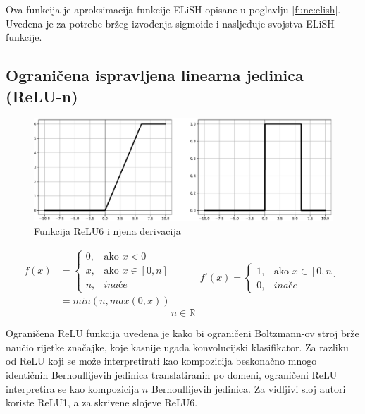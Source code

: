 \documentclass[times, utf8, numeric, diplomski]{fer}
\def\realnum{\mathbb{R}}
\def\otherwise{\textit{inače}}
\begin{document}
Ova funkcija je aproksimacija funkcije ELiSH opisane u poglavlju \ref{func:elish}. Uvedena je za potrebe bržeg izvođenja sigmoide i nasljeđuje svojstva ELiSH funkcije. \citep{elish}

\subsection{Ograničena ispravljena linearna jedinica (ReLU-n)}
\label{func:relun}

\begin{figure}[H]
\includegraphics[width=\textwidth]{func_ReLU6.pdf}
\centering
\caption{Funkcija ReLU6 i njena derivacija}
\label{fig:relu6}
\end{figure}

\begin{equation}
\label{eq:relun}
\begin{split}
f(x) &= \begin{cases}
0,		& \text{ako } x < 0 \\
x,		& \text{ako } x \in [0, n] \\
n,		& \otherwise
\end{cases} \\
&= min(n, max(0, x))
\end{split}
\qquad
\begin{split}
f'(x) = 
\begin{cases}
1,		& \text{ako } x \in [0, n] \\
0,		& \otherwise
\end{cases}
\end{split}
\end{equation}
\begin{equation*}
n \in \realnum
\end{equation*}

Ograničena ReLU funkcija uvedena je kako bi ograničeni Boltzmann-ov stroj  brže naučio rijetke značajke, koje kasnije ugađa konvolucijski klasifikator. Za razliku od ReLU koji se može interpretirati kao kompozicija beskonačno mnogo identičnih Bernoullijevih jedinica translatiranih po domeni, ograničeni ReLU interpretira se kao kompozicija $n$ Bernoullijevih jedinica. Za vidljivi sloj autori koriste ReLU1, a za skrivene slojeve ReLU6. \citep{relu6}
\end{document}
